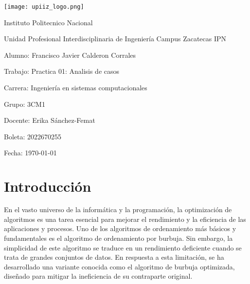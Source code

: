 \documentclass[journal]{IEEEtran}
\begin{document}
\begin{titlepage}
    \centering
    \vspace*{1cm}
    \texttt{[image: upiiz\_logo.png]}\par
    \vspace{1cm}
    {\LARGE Instituto Politecnico Nacional\par}
    \vspace{1cm}
    {\Large Unidad Profesional Interdisciplinaria de Ingeniería Campus Zacatecas IPN\par}
    \vspace{1cm}
    {\large Alumno: Francisco Javier Calderon Corrales\par}
    \vspace{0.5cm}
    {\large Trabajo: Practica 01: Analisis de casos\par}
    \vspace{0.5cm}
    {\large Carrera: Ingeniería en sistemas computacionales\par}
    \vspace{0.5cm}
    {\large Grupo: 3CM1\par}
    \vspace{0.5cm}
    {\large Docente: Erika Sánchez-Femat\par}
    \vspace{0.5cm}
    {\large Boleta: 2022670255\par}
    \vspace{1cm}
    {\large Fecha: \today\par}
\end{titlepage}

\begin{abstract}
    En este documento se abordará el tema del análisis de casos 
    para los algoritmos, más específicamente del algoritmo de 
    ordenamiento por el método de burbuja, se hablara acerca del 
    algoritmo de burbuja y su implementación, así como la versión 
    optimizada de este algoritmo, por último se detalla la complejidad 
    del algoritmo por la notación big-oh
\end{abstract}

\section{Introducción}
En el vasto universo de la informática y la programación, la optimización 
de algoritmos es una tarea esencial para mejorar el rendimiento y la 
eficiencia de las aplicaciones y procesos. Uno de los algoritmos de 
ordenamiento más básicos y fundamentales es el algoritmo de ordenamiento 
por burbuja. Sin embargo, la simplicidad de este algoritmo se traduce en 
un rendimiento deficiente cuando se trata de grandes conjuntos de datos. 
En respuesta a esta limitación, se ha desarrollado una variante conocida 
como el algoritmo de burbuja optimizada, diseñado para mitigar la ineficiencia 
de su contraparte original.
\end{document}
